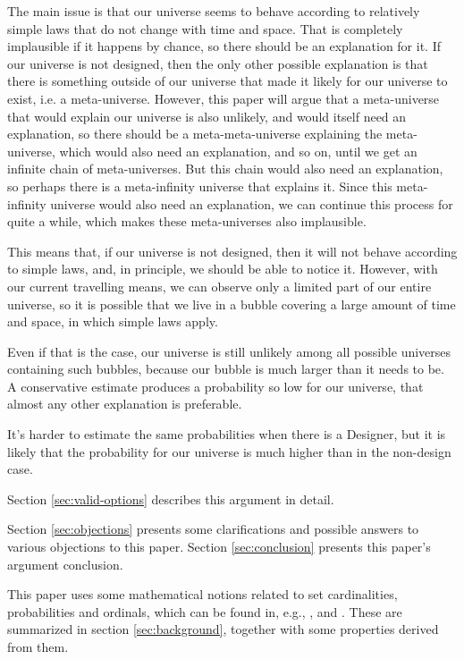 \documentclass[a4paper
,draft
]{article}
\newcommand{\paper}[1]{paper}
\begin{document}
The main issue is that our universe seems to behave according to relatively
simple laws that do not change with time and space.
That is completely
implausible if it happens by chance, so there should be an explanation for it.
If our universe is not designed, then the only other possible explanation is that
there is something outside of our universe that made it likely for our universe
to exist, i.e. a meta-universe.
However, this paper will argue that a meta-universe that
would explain our universe is also unlikely, and would itself need an
explanation, so there should be a meta-meta-universe explaining the
meta-universe, which would also need an
explanation, and so on, until we get an infinite chain of meta-universes.
But this chain would also need an explanation, so perhaps there is a
meta-infinity universe that explains it.
Since this meta-infinity universe would also need an explanation, we can
continue this process for quite a while,
which makes these meta-universes also implausible.

This means that, if our universe is not designed, then it will not behave
according to simple laws, and, in principle, we should be able to notice it.
However, with our current travelling means, we can observe only a limited
part of our entire universe, so it is possible that we live in a bubble covering
a large amount of time and space, in which simple laws apply.

Even if that is the case, our universe is still unlikely among all possible
universes
containing such bubbles, because our bubble is much larger than it needs to
be.
A conservative estimate produces a probability so low for our universe,
that almost any other explanation is preferable.

It's harder to estimate the same probabilities when there is a Designer, but
it is likely that the probability for our universe is much higher than in the
non-design case.

Section \ref{sec:valid-options} describes this argument in detail.

Section \ref{sec:objections} presents some clarifications and possible
answers to various objections to this paper.
Section \ref{sec:conclusion} presents this \paper{}'s argument conclusion.

This \paper{} uses some mathematical notions related to set cardinalities,
probabilities and ordinals, which can be found in, e.g.,
\textcite{sep-set-theory}, \textcite{Cohen1966} and \textcite{Billingsley1995}.
These are summarized in section \ref{sec:background}, together with some properties
derived from them.
\end{document}
